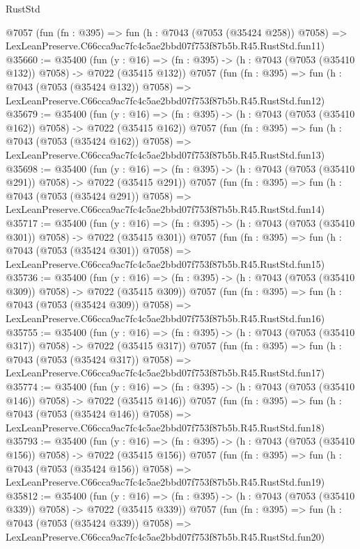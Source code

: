 \begin{lexlean}{RustStd}
\begin{coremodule}
    @7057
    (fun (fn : @395) =>
    fun (h : @7043 (@7053 (@35424 @258)) @7058) =>
    LexLeanPreserve.C66cca9ac7fc4c5ae2bbd07f753f87b5b.R45.RustStd.fun11)
@35660 := @35400
    (fun (y : @16) => (fn : @395) -> (h : @7043 (@7053 (@35410 @132)) @7058) -> @7022 (@35415 @132))
    @7057
    (fun (fn : @395) =>
    fun (h : @7043 (@7053 (@35424 @132)) @7058) =>
    LexLeanPreserve.C66cca9ac7fc4c5ae2bbd07f753f87b5b.R45.RustStd.fun12)
@35679 := @35400
    (fun (y : @16) => (fn : @395) -> (h : @7043 (@7053 (@35410 @162)) @7058) -> @7022 (@35415 @162))
    @7057
    (fun (fn : @395) =>
    fun (h : @7043 (@7053 (@35424 @162)) @7058) =>
    LexLeanPreserve.C66cca9ac7fc4c5ae2bbd07f753f87b5b.R45.RustStd.fun13)
@35698 := @35400
    (fun (y : @16) => (fn : @395) -> (h : @7043 (@7053 (@35410 @291)) @7058) -> @7022 (@35415 @291))
    @7057
    (fun (fn : @395) =>
    fun (h : @7043 (@7053 (@35424 @291)) @7058) =>
    LexLeanPreserve.C66cca9ac7fc4c5ae2bbd07f753f87b5b.R45.RustStd.fun14)
@35717 := @35400
    (fun (y : @16) => (fn : @395) -> (h : @7043 (@7053 (@35410 @301)) @7058) -> @7022 (@35415 @301))
    @7057
    (fun (fn : @395) =>
    fun (h : @7043 (@7053 (@35424 @301)) @7058) =>
    LexLeanPreserve.C66cca9ac7fc4c5ae2bbd07f753f87b5b.R45.RustStd.fun15)
@35736 := @35400
    (fun (y : @16) => (fn : @395) -> (h : @7043 (@7053 (@35410 @309)) @7058) -> @7022 (@35415 @309))
    @7057
    (fun (fn : @395) =>
    fun (h : @7043 (@7053 (@35424 @309)) @7058) =>
    LexLeanPreserve.C66cca9ac7fc4c5ae2bbd07f753f87b5b.R45.RustStd.fun16)
@35755 := @35400
    (fun (y : @16) => (fn : @395) -> (h : @7043 (@7053 (@35410 @317)) @7058) -> @7022 (@35415 @317))
    @7057
    (fun (fn : @395) =>
    fun (h : @7043 (@7053 (@35424 @317)) @7058) =>
    LexLeanPreserve.C66cca9ac7fc4c5ae2bbd07f753f87b5b.R45.RustStd.fun17)
@35774 := @35400
    (fun (y : @16) => (fn : @395) -> (h : @7043 (@7053 (@35410 @146)) @7058) -> @7022 (@35415 @146))
    @7057
    (fun (fn : @395) =>
    fun (h : @7043 (@7053 (@35424 @146)) @7058) =>
    LexLeanPreserve.C66cca9ac7fc4c5ae2bbd07f753f87b5b.R45.RustStd.fun18)
@35793 := @35400
    (fun (y : @16) => (fn : @395) -> (h : @7043 (@7053 (@35410 @156)) @7058) -> @7022 (@35415 @156))
    @7057
    (fun (fn : @395) =>
    fun (h : @7043 (@7053 (@35424 @156)) @7058) =>
    LexLeanPreserve.C66cca9ac7fc4c5ae2bbd07f753f87b5b.R45.RustStd.fun19)
@35812 := @35400
    (fun (y : @16) => (fn : @395) -> (h : @7043 (@7053 (@35410 @339)) @7058) -> @7022 (@35415 @339))
    @7057
    (fun (fn : @395) =>
    fun (h : @7043 (@7053 (@35424 @339)) @7058) =>
    LexLeanPreserve.C66cca9ac7fc4c5ae2bbd07f753f87b5b.R45.RustStd.fun20)

\end{coremodule}
\end{lexlean}
